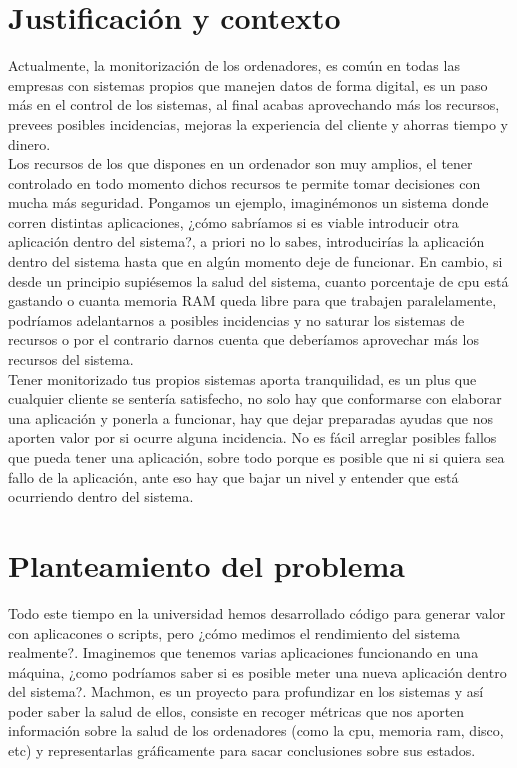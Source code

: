 \documentclass[ spanish, a4paper, 12pt, oneside]{report}
\begin{document}
\section{Justificación y contexto}


Actualmente, la monitorización de los ordenadores, es común en todas las empresas con sistemas propios que manejen datos de forma 
digital, es un paso más en el control de los sistemas, al final acabas aprovechando más los recursos, prevees posibles incidencias, mejoras la 
experiencia del cliente y ahorras tiempo y dinero. \\

Los recursos de los que dispones en un ordenador son muy amplios, el tener controlado en todo momento dichos recursos te permite tomar decisiones
con mucha más seguridad. Pongamos un ejemplo, imaginémonos un sistema donde corren distintas aplicaciones, ¿cómo sabríamos si es viable introducir otra 
aplicación dentro del sistema?, a priori no lo sabes, introducirías la aplicación dentro del sistema hasta que en algún momento deje de funcionar. 
En cambio, si desde un principio supiésemos la salud del sistema, cuanto porcentaje de cpu está gastando o cuanta memoria RAM queda libre para que trabajen
paralelamente, podríamos adelantarnos a posibles incidencias y no saturar los sistemas de recursos o por el contrario darnos cuenta que deberíamos 
aprovechar más los recursos del sistema.\\

Tener monitorizado tus propios sistemas aporta tranquilidad, es un plus que cualquier cliente se sentería satisfecho, no solo hay que conformarse con elaborar 
una aplicación y ponerla a funcionar, hay que dejar preparadas ayudas que nos aporten valor por si ocurre alguna incidencia. No es fácil arreglar posibles fallos
que pueda tener una aplicación, sobre todo porque es posible que ni si quiera sea fallo de la aplicación, ante eso hay que bajar un nivel y entender  
que está ocurriendo dentro del sistema.\\ 

\section{Planteamiento del problema}
Todo este tiempo en la universidad hemos desarrollado código para generar valor con aplicacones o scripts, pero ¿cómo medimos 
el rendimiento del sistema realmente?. Imaginemos que tenemos varias aplicaciones funcionando en una máquina, ¿como 
podríamos saber si es posible meter una nueva aplicación dentro del sistema?. Machmon, es un proyecto para profundizar en 
los sistemas y así poder saber la salud de ellos, consiste en recoger métricas que nos aporten información sobre la salud de los
ordenadores (como la cpu, memoria ram, disco, etc) y representarlas gráficamente para sacar conclusiones sobre sus estados. \\
\end{document}
